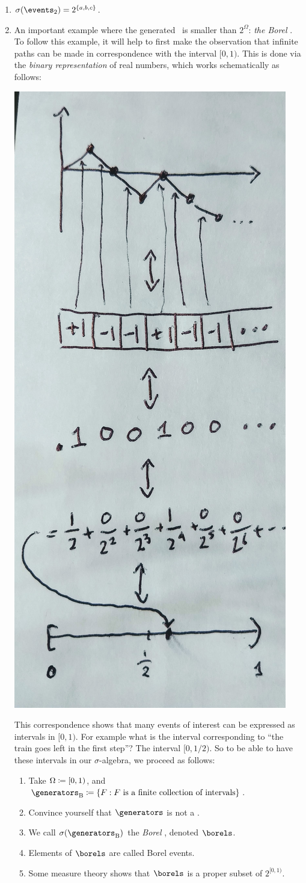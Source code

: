 \documentclass{article}
\begin{document}
\begin{enumerate}
  \item $\sigma(\events_2) = 2^{\{a,b,c\}}$.
  \item An important example where the generated \sigmaalg\ is smaller than $2^\Omega$: \emph{the Borel \sigmaalg}. To follow this example, it will help to first make the observation that infinite paths can be made in correspondence with the interval $[0, 1)$. This is done via the \emph{binary representation} of real numbers, which works schematically as follows: 
  \begin{center}
  	\includegraphics[width=0.3\linewidth]{figures/binary}
  \end{center} 
  This correspondence shows that many events of interest can be expressed as intervals in $[0, 1)$. For example what is the interval corresponding to ``the train goes left in the first step''? The interval $[0, 1/2)$.
  So to be able to have these intervals in our $\sigma$-algebra, we proceed as follows:
  \begin{enumerate}
    \item Take $\Omega \coloneqq [0, 1)$, and $\generators_\text{B} \defeq \{F : F\text{ is a finite collection of intervals}\}$.
    \item Convince yourself that $\generators$ is not a \sigmaalg.
    \item We call $\sigma(\generators_\text{B})$ the \emph{Borel \sigmaalg}, denoted $\borels$.
    \item Elements of $\borels$ are called Borel events.
    \item Some measure theory shows that $\borels$ is a proper subset of $2^{[0, 1)}$.
  \end{enumerate}
\end{enumerate}
\end{document}
